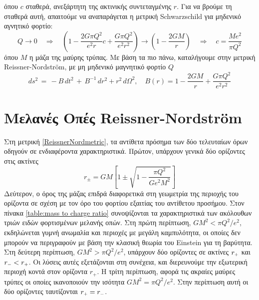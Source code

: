 όπου $c$ σταθερά, ανεξάρτητη της ακτινικής συντεταγμένης $r$. Για να βρούμε τη σταθερά αυτή, απαιτούμε να αναπαράγεται η μετρική Schwarzschild για μηδενικό αγνητικό φορτίο: 
\begin{equation*}
    Q\rightarrow 0 \quad \Rightarrow \quad \left(1-\frac{2G\pi Q^2}{e^2r}c+\frac{G\pi Q^2}{e^2r^2}\right)\rightarrow \left(1-\frac{2GM}{r}\right)\quad\Rightarrow \quad c=\frac{M e^2}{\pi Q^2 }
\end{equation*}
όπου $M$ η μάζα της μαύρης τρύπας.
Με βάση τα πιο πάνω, καταλήγουμε στην μετρική Reissner-Nordström, με μη μηδενικό μαγνητικό φορτίο $Q$
\begin{equation}\label{ReissnerNordmetric}
    ds^2 \,=\, -B\,dt^2\,+\,B^{-1}\,dr^2+r^2\,d\Omega^2, \quad B(r)=1-\frac{2G M}{r}+\frac{G\pi Q^2}{e^2r^2}
\end{equation}


\section{Μελανές Οπές Reissner-Nordström}
Στη μετρική \eqref{ReissnerNordmetric}, τα αντίθετα πρόσημα των δύο τελευταίων όρων οδηγούν σε ενδιαφέροντα χαρακτηριστικά. Πρώτον, υπάρχουν γενικά δύο ορίζοντες 
στις ακτίνες
\begin{equation}\label{horizon radius}
    r_{\pm} = GM\left[1\pm\sqrt{1 - \frac{\pi Q^2}{Ge^2M^2}}\right]
\end{equation}
Δεύτερον, ο όρος της μάζας επιδρά διαφορετικά στη γεωμετρία της περιοχής του ορίζοντα σε σχέση με τον όρο του φορτίου εξαιτίας του αντίθετου προσήμου. Στον πίνακα \ref{table:mass to charge ratio} συνοψίζονται τα χαρακτηριστικά των ακόλουθων τριών ειδών φορτισμένων μελανής οπών. 
Στη πρώτη περίπτωση, $GM^2<\pi Q^2/e^2$, εκδηλώνεται γυμνή ανωμαλία και περιοχές με μεγάλη καμπυλότητα, οι οποίες δεν μπορούν να περιγραφούν με βάση την κλασική θεωρία του Einstein για τη βαρύτητα. 
Στη δεύτερη περίπτωση, $GM^2>\pi Q^2/e^2$, υπάρχουν δύο ορίζοντες σε ακτίνες $r\subscr{+}$ και $r\subscr{-}<r\subscr{+}$. Οι λύσεις αυτές εξετάζονται στη συνέχεια, και διερευνούμε την εξωτερική περιοχή κοντά στον ορίζοντα $r_+$. Η τρίτη περίπτωση, αφορά τις ακραίες μαύρες τρύπες οι οποίες ικανοποιούν την ισότητα $GM^2=\pi Q^2/e^2$. Στην περίπτωση αυτή οι δύο ορίζοντες ταυτίζονται $r\subscr{+}=r\subscr{-}$.

